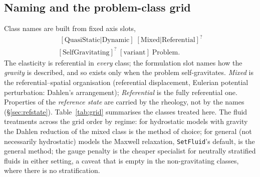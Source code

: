 \documentclass[11pt]{article}
\numberwithin{equation}{section}
\theoremstyle{remark}
\newcommand{\code}[1]{\texttt{#1}}
\begin{document}
\subsection{Naming and the problem-class grid}

Class names are built from fixed axis slots,
\begin{multline*}
  [\text{Linear}|\text{Nonlinear}]\;[\text{QuasiStatic}|\text{Dynamic}]\;
  [\text{Mixed}|\text{Referential}]^{?}\\
  [\text{SelfGravitating}]^{?}\;[\text{variant}]\;\text{Problem}.
\end{multline*}
The elasticity is referential in \emph{every} class; the formulation slot
names how the \emph{gravity} is described, and so exists only when the
problem self-gravitates. \emph{Mixed} is the referential--spatial
organisation (referential displacement, Eulerian potential perturbation:
Dahlen's arrangement); \emph{Referential} is the fully referential one.
Properties of the \emph{reference state} are carried by the rheology, not
by the names (\S\ref{sec:refstate}). Table~\ref{tab:grid} summarises the
classes treated here. The fluid treatments across the grid order by
regime: for hydrostatic models with gravity the Dahlen reduction of the
mixed class is the method of choice; for general (not necessarily
hydrostatic) models the Maxwell relaxation, \code{SetFluid}'s default,
is the general method; the gauge penalty is the cheaper specialist for
neutrally stratified fluids in either setting, a caveat that is empty in
the non-gravitating classes, where there is no stratification.
\end{document}

